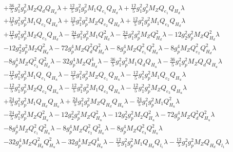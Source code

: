 \begin{align}
 &+\frac{36}{5} g_{1}^{2} g_{p}^{2} M_Z Q_{d} Q_{H_d} \lambda +\frac{12}{5} g_{1}^{2} g_{p}^{2} M_1 Q_{e_{1}} Q_{H_d} \lambda +\frac{12}{5} g_{1}^{2} g_{p}^{2} M_Z Q_{e_{1}} Q_{H_d} \lambda \nonumber \\ 
 &+\frac{12}{5} g_{1}^{2} g_{p}^{2} M_1 Q_{e_{2}} Q_{H_d} \lambda +\frac{12}{5} g_{1}^{2} g_{p}^{2} M_Z Q_{e_{2}} Q_{H_d} \lambda +\frac{12}{5} g_{1}^{2} g_{p}^{2} M_1 Q_{e_3} Q_{H_d} \lambda \nonumber \\ 
 &+\frac{12}{5} g_{1}^{2} g_{p}^{2} M_Z Q_{e_3} Q_{H_d} \lambda -\frac{24}{5} g_{1}^{2} g_{p}^{2} M_1 Q_{H_d}^{2} \lambda -\frac{24}{5} g_{1}^{2} g_{p}^{2} M_Z Q_{H_d}^{2} \lambda -12 g_{2}^{2} g_{p}^{2} M_Z Q_{H_d}^{2} \lambda \nonumber \\ 
 &-12 g_{2}^{2} g_{p}^{2} M_2 Q_{H_d}^{2} \lambda -72 g_{p}^{4} M_Z Q_{d}^{2} Q_{H_d}^{2} \lambda -8 g_{p}^{4} M_Z Q_{e_{1}}^{2} Q_{H_d}^{2} \lambda -8 g_{p}^{4} M_Z Q_{e_{2}}^{2} Q_{H_d}^{2} \lambda \nonumber \\ 
 &-8 g_{p}^{4} M_Z Q_{e_3}^{2} Q_{H_d}^{2} \lambda -32 g_{p}^{4} M_Z Q_{H_d}^{4} \lambda -\frac{36}{5} g_{1}^{2} g_{p}^{2} M_1 Q_{d} Q_{H_u} \lambda -\frac{36}{5} g_{1}^{2} g_{p}^{2} M_Z Q_{d} Q_{H_u} \lambda \nonumber \\ 
 &-\frac{12}{5} g_{1}^{2} g_{p}^{2} M_1 Q_{e_{1}} Q_{H_u} \lambda -\frac{12}{5} g_{1}^{2} g_{p}^{2} M_Z Q_{e_{1}} Q_{H_u} \lambda -\frac{12}{5} g_{1}^{2} g_{p}^{2} M_1 Q_{e_{2}} Q_{H_u} \lambda \nonumber \\ 
 &-\frac{12}{5} g_{1}^{2} g_{p}^{2} M_Z Q_{e_{2}} Q_{H_u} \lambda -\frac{12}{5} g_{1}^{2} g_{p}^{2} M_1 Q_{e_3} Q_{H_u} \lambda -\frac{12}{5} g_{1}^{2} g_{p}^{2} M_Z Q_{e_3} Q_{H_u} \lambda \nonumber \\ 
 &+\frac{24}{5} g_{1}^{2} g_{p}^{2} M_1 Q_{H_d} Q_{H_u} \lambda +\frac{24}{5} g_{1}^{2} g_{p}^{2} M_Z Q_{H_d} Q_{H_u} \lambda -\frac{24}{5} g_{1}^{2} g_{p}^{2} M_1 Q_{H_u}^{2} \lambda \nonumber \\ 
 &-\frac{24}{5} g_{1}^{2} g_{p}^{2} M_Z Q_{H_u}^{2} \lambda -12 g_{2}^{2} g_{p}^{2} M_Z Q_{H_u}^{2} \lambda -12 g_{2}^{2} g_{p}^{2} M_2 Q_{H_u}^{2} \lambda -72 g_{p}^{4} M_Z Q_{d}^{2} Q_{H_u}^{2} \lambda \nonumber \\ 
 &-8 g_{p}^{4} M_Z Q_{e_{1}}^{2} Q_{H_u}^{2} \lambda -8 g_{p}^{4} M_Z Q_{e_{2}}^{2} Q_{H_u}^{2} \lambda -8 g_{p}^{4} M_Z Q_{e_3}^{2} Q_{H_u}^{2} \lambda \nonumber \\ 
 &-32 g_{p}^{4} M_Z Q_{H_d}^{2} Q_{H_u}^{2} \lambda -32 g_{p}^{4} M_Z Q_{H_u}^{4} \lambda -\frac{12}{5} g_{1}^{2} g_{p}^{2} M_1 Q_{H_d} Q_{l_1} \lambda -\frac{12}{5} g_{1}^{2} g_{p}^{2} M_Z Q_{H_d} Q_{l_1} \lambda \nonumber 
\end{align} 

